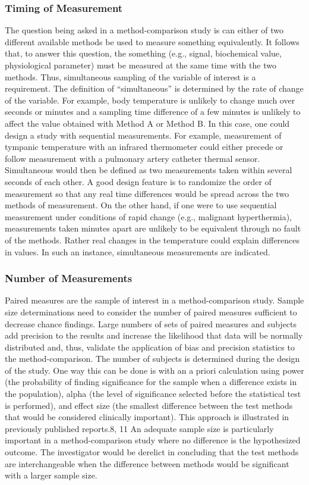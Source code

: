\documentclass[]{article}
\begin{document}
\subsubsection{Timing of Measurement}
The question being asked in a method-comparison study is can either of two different available methods be used to measure something equivalently. It follows that, to answer this question, the something (e.g., signal, biochemical value, physiological parameter) must be measured at the same time with the two methods. Thus, simultaneous sampling of the variable of interest is a requirement. The definition of “simultaneous” is determined by the rate of change of the variable. For example, body temperature is unlikely to change much over seconds or minutes and a sampling time difference of a few minutes is unlikely to affect the value obtained with Method A or Method B. In this case, one could design a study with sequential measurements. For example, measurement of tympanic temperature with an infrared thermometer could either precede or follow measurement with a pulmonary artery catheter thermal sensor. Simultaneous would then be defined as two measurements taken within several seconds of each other. A good design feature is to randomize the order of measurement so that any real time differences would be spread across the two methods of measurement. On the other hand, if one were to use sequential measurement under conditions of rapid change (e.g., malignant hyperthermia), measurements taken minutes apart are unlikely to be equivalent through no fault of the methods. Rather real changes in the temperature could explain differences in values. In such an instance, simultaneous measurements are indicated.

\subsubsection*{Number of Measurements}
Paired measures are the sample of interest in a method-comparison study. Sample size determinations need to consider the number of paired measures sufficient to decrease chance findings. Large numbers of sets of paired measures and subjects add precision to the results and increase the likelihood that data will be normally distributed and, thus, validate the application of bias and precision statistics to the method-comparison. The number of subjects is determined during the design of the study. One way this can be done is with an a priori calculation using power (the probability of finding significance for the sample when a difference exists in the population), alpha (the level of significance selected before the statistical test is performed), and effect size (the smallest difference between the test methods that would be considered clinically important). This approach is illustrated in previously published reports.8, 11 An adequate sample size is particularly important in a method-comparison study where no difference is the hypothesized outcome. The investigator would be derelict in concluding that the test methods are interchangeable when the difference between methods would be significant with a larger sample size.
\end{document}
